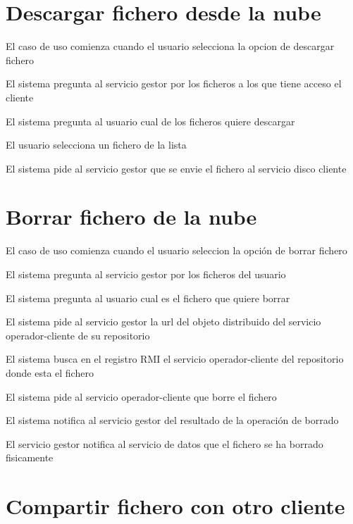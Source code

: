\section{Descargar fichero desde la nube}
\begin{compactenum}
\item El caso de uso comienza cuando el usuario selecciona la opcion de descargar fichero
\item El sistema pregunta al servicio gestor por los ficheros a los que tiene acceso el cliente
\item El sistema pregunta al usuario cual de los ficheros quiere descargar
\item El usuario selecciona un fichero de la lista
\item El sistema pide al servicio gestor que se envie el fichero al servicio disco cliente
\end{compactenum}

\section{Borrar fichero de la nube}
\begin{compactenum}
\item El caso de uso comienza cuando el usuario seleccion la opción de borrar fichero
\item El sistema pregunta al servicio gestor por los ficheros del usuario
\item El sistema pregunta al usuario cual es el fichero que quiere borrar
\item El sistema pide al servicio gestor la url del objeto distribuido del servicio operador-cliente de su repositorio
\item El sistema busca en el registro RMI el servicio operador-cliente del repositorio donde esta el fichero
\item El sistema pide al servicio operador-cliente que borre el fichero
\item El sistema notifica al servicio gestor del resultado de la operación de borrado
\item El servicio gestor notifica al servicio de datos que el fichero se ha borrado fisicamente
\end{compactenum}


\section{Compartir fichero con otro cliente}
